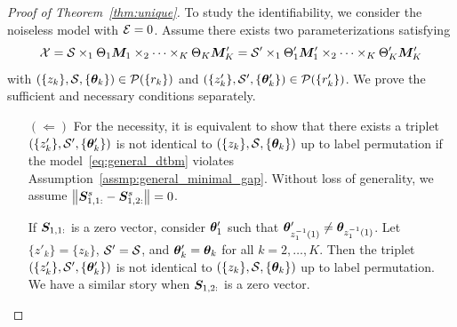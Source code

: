 \documentclass[lettersize,journal]{IEEEtran}
\theoremstyle{definition}
\theoremstyle{definition}
\newcommand{\of}[1]{\left(#1\right)}
\begin{document}
\begin{proof}[Proof of Theorem~\ref{thm:unique}] 

To study the identifiability, we consider the noiseless model with $\mathcal{E} = 0$. Assume there exists two parameterizations satisfying
\begin{equation}\label{eq:another}
    \tX=\tS\times_1\Theta_1 \mM_1 \times_2 \cdots \times_K \Theta_K \mM'_K=\tS'\times_1\Theta'_1 \mM'_1 \times_2 \cdots \times_K \Theta'_K \mM'_K
\end{equation}
with $\of{ \{z_k\}, \tS, \{ \mtheta_k \} } \in \tP(\{r_k\})$ and $\of{ \{z'_k\}, \tS', \{ \mtheta'_k \} } \in \tP(\{r_k'\})$. We prove the sufficient and necessary conditions separately.

\begin{enumerate}
    \item[$(\Leftarrow)$] For the necessity, it is equivalent to show that there exists a triplet $\of{ \{z'_k\}, \tS', \{ \mtheta'_k \} }$ is not identical to $\of{ \{z_k\}, \tS, \{ \mtheta_k \} }$ up to label permutation if the model~\eqref{eq:general_dtbm} violates Assumption~\ref{assmp:general_minimal_gap}. Without loss of generality, we assume $\left\lVert \bm S_{1,1:}^s - \bm S_{1,2:}^s \right\rVert = 0$.

 If $\bm S_{1,1:}$ is a zero vector, consider $\boldsymbol{\theta}_1'$ such that $\boldsymbol{\theta}'_{z_1^{-1}(1)} \neq \boldsymbol{\theta}_{z_1^{-1}(1)}$. Let $\{z'_k\} = \{z_k\}$, $\mathcal{S}' = \mathcal{S}$, and $\boldsymbol{\theta}'_k = \boldsymbol{\theta}_k$ for all $k = 2, \ldots, K$. Then the triplet $\of{ \{z'_k\}, \tS', \{ \mtheta'_k \} }$ is not identical to $\of{ \{z_k\}, \tS, \{ \mtheta_k \} }$ up to label permutation. We have a similar story when $\bm S_{1,2:}$ is a zero vector. 


\end{enumerate}
\end{proof}
\end{document}
